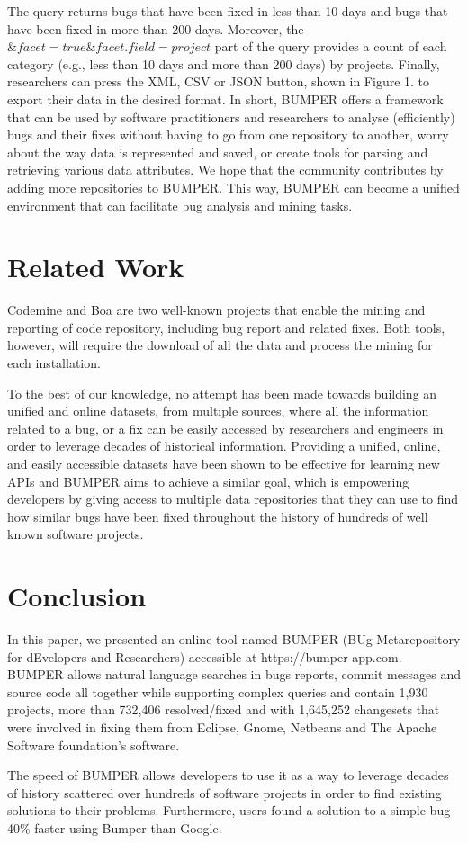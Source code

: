 \documentclass[conference]{IEEEtran}
\begin{document}
The query returns bugs that have been fixed in less than 10 days and bugs that have been fixed in more than 200 days.
Moreover, the $\&facet=true\&facet.field=project$ part of the query provides a count of each category (e.g., less than 10 days and more than 200 days) by projects.
Finally, researchers can press the XML, CSV or JSON button, shown in Figure 1. to export their data in the desired format.
In short, BUMPER offers a framework that can be used by software practitioners and researchers to analyse (efficiently) bugs and their fixes without having to go from one repository to another,  worry about the way data is represented and saved, or create tools for parsing and retrieving various data attributes. We hope that the community contributes by adding more repositories to BUMPER. This way, BUMPER can become a unified environment that can facilitate bug analysis and mining tasks.

\section{Related Work}
\label{sec:Related Work}

Codemine \cite{Czerwonka2013} and Boa \cite{Bizer2011} are two well-known projects that enable the mining and reporting of code repository, including bug report and related fixes.
Both tools, however, will require the download of all the data and process the mining for each installation.

To the best of our knowledge, no attempt has been made towards building an unified and online datasets, from multiple sources, where all the information related to a bug, or a fix can be easily accessed by researchers and engineers in order to leverage decades of historical information.
Providing a unified, online, and easily accessible datasets have been shown to be effective for learning new APIs\cite{Montandon2013,Rahman2013} and BUMPER aims to achieve a similar goal, which is empowering developers by giving access to multiple data repositories that they can use to find how similar bugs have been fixed throughout the history of hundreds of well known software projects.


\section{Conclusion}
\label{sec:conclusion}

In this paper, we presented an online tool named BUMPER (BUg Metarepository for dEvelopers and Researchers) accessible at https://bumper-app.com. BUMPER allows natural language searches in bugs reports, commit messages and source code all together while supporting complex queries and contain 1,930 projects, more than 732,406 resolved/fixed and with 1,645,252 changesets that were involved in fixing them from Eclipse, Gnome, Netbeans and The Apache Software foundation’s software.

The speed of BUMPER allows developers to use it as a way to leverage decades of history scattered over hundreds of software projects in order to find existing solutions to their problems.
Furthermore, users found a solution to a simple bug 40\% faster using Bumper than Google.




\end{document}
